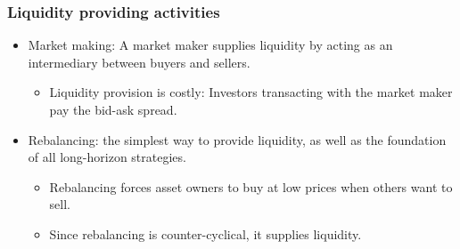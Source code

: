 \subsubsection{Liquidity providing activities}
\begin{itemize}
\item Market making: A market maker supplies liquidity by acting as an intermediary between buyers and sellers.
    \begin{itemize}
    \item Liquidity provision is costly: Investors transacting with the market maker pay the bid-ask spread.
    \end{itemize}
    
\item Rebalancing: the simplest way to provide liquidity, as well as the foundation of all long-horizon strategies.
    \begin{itemize}
    \item Rebalancing forces asset owners to buy at low prices when others want to sell.
    \item Since rebalancing is counter-cyclical, it supplies liquidity.
    \end{itemize}
    
\end{itemize}



